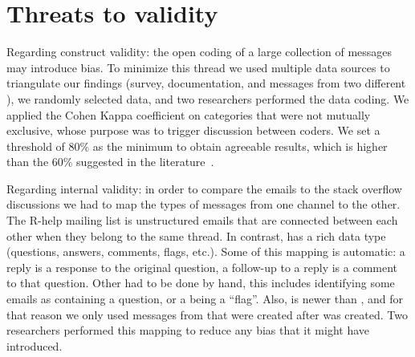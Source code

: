 

\section{Threats to validity}
\label{cha:threats}


Regarding construct validity: the open coding of a large collection of messages may introduce bias.  To minimize this thread we used multiple data sources to
triangulate our findings (survey, documentation, and messages from two different \channels), we randomly selected data, and two researchers
performed the data coding. We applied the Cohen Kappa coefficient on categories that were not mutually exclusive, whose purpose was to trigger discussion
between coders.  We set a threshold of 80\% as the minimum to obtain agreeable results, which is higher than the 60\% suggested in the
literature~\cite{Landis1977}. 

Regarding internal validity: in order to compare the emails to the stack overflow discussions we had to map the types of messages from one channel to the
other. The R-help mailing list is unstructured emails that are connected between each other when they belong to the same thread. In contrast, \SO has a rich
data type (questions, answers, comments, flags, etc.). Some of this mapping is automatic: a reply is a response to the original question, a follow-up to a reply
is a comment to that question. Other had to be done by hand, this includes identifying some emails as containing a question, or a being a ``flag''.
Also, \SO is newer than \RH, and for that reason we only used messages from \RH that were created after \SO was created.
Two researchers performed this mapping to reduce any bias that it might have  introduced.


